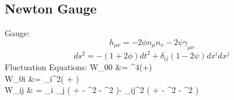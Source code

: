 \documentclass[10pt,letterpaper]{article}
\begin{document}
\subsection*{Newton Gauge}
Gauge:
\[
	h_{\mu\nu} = -2 \phi n_\mu n_\nu - 2\psi\gamma_{\mu\nu} 
\]
\[
	ds^2 =  -(1+2\phi)dt^2 + \delta_{ij}(1-2\psi)dx^i dx^j
\]
Fluctuation Equations:
\ba
	\delta W_{00} &= \del^4(\phi+\psi)\\
	\delta W_{0i} &=  \del_i\del^2( \dot \phi + \dot\psi)\\
	\delta W_{ij} & = \del_i \del_j ( \ddot \phi + \ddot \psi -  \del^2 \phi -  \del^2 \psi)- \delta_{ij}\del^2 ( \ddot \phi + \ddot \psi - \del^2 \phi - \del^2 \psi)
\ea
%
\end{document}
